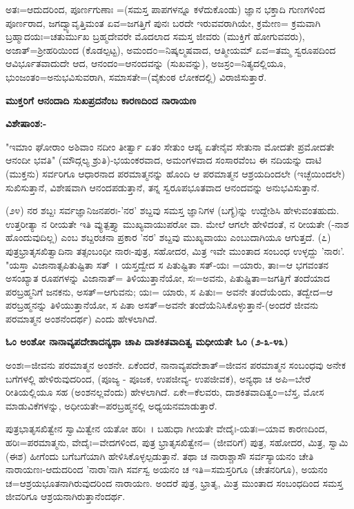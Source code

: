 ಅತಃ=ಆದುದರಿಂದ, ಪೂರ್ಣಗುಣಾಃ =(ಸಮಸ್ತ ಪಾಪಗಳನ್ನೂ ಕಳೆದುಕೊಂಡು) ಜ್ಞಾನ ಭಕ್ತಾದಿ ಗುಣಗಳಿಂದ ಪೂರ್ಣರಾದ, ಜಗದ್ವ್ಯಾವೃತ್ತಿಮಂತ ಏವ=ಜಗತ್ತಿಗೆ ಪುನಃ ಬರದೇ ಇರುವವರಾಗಿಯೇ, ಕ್ರಮೇಣ= ಕ್ರಮವಾಗಿ ಬ್ರಹ್ಮಾದಯಃ=ಚತುರ್ಮುಖ ಬ್ರಹ್ಮದೇವರೇ ಮೊದಲಾದ ಸಮಸ್ತ ಜೀವರು (ಮುಕ್ತಿಗೆ ಹೋಗುವವರು), ಅಜಾತ್=ಶ‍್ರೀಹರಿಯಿಂದ (ಕೊಡಲ್ಪಟ್ಟ), ಅಮಂದ೦=ನಿಷ್ಕಲ್ಮಷವಾದ, ಆತ್ಮೀಯಮ್ ಏವ=ತಮ್ಮ ಸ್ವರೂಪದಿಂದ ಆವಿರ್ಭೂತವಾದುದೇ ಆದ, ಆನಂದಂ=ಆನಂದವನ್ನು (ಸುಖವನ್ನು), ಅಜಸ್ರಂ=ನಿತ್ಯದಲ್ಲಿಯೂ, ಭುಂಜಂತಂ=ಅನುಭವಿಸುವರಾಗಿ, ಸಮಾಸತೇ=(ವೈಕುಂಠ ಲೋಕದಲ್ಲಿ) ವಿರಾಜಿಸುತ್ತಾರೆ.

\begin{center}
\textbf{ಮುಕ್ತರಿಗೆ ಆನಂದಾದಿ ಸುಖಪ್ರದನೆಂಬ ಕಾರಣದಿಂದ ನಾರಾಯಣ}
\end{center}

\noindent
\textbf{ವಿಶೇಷಾಂಶ:-}

"ಇಮಾಂ ಘೋರಾಂ ಅಶಿವಾಂ ನದೀಂ ತೀರ್ತ್ವಾ ಏತಂ ಸೇತುಂ ಆಪ್ಯ ಏತೇನೈವ ಸೇತುನಾ ಮೋದತೇ ಪ್ರಮೋದತೇ ಆನಂದೀ ಭವತಿ" (ಮೌದ್ಗಲ್ಯ ಶ್ರುತಿ)-ಭಯಂಕರವಾದ, ಅಮಂಗಳವಾದ ಸಂಸಾರವೆಂಬ ಈ ನದಿಯನ್ನು ದಾಟಿ (ಮುಕ್ತನು) ಸರ್ವರಿಗೂ ಆಧಾರನಾದ ಪರಮಾತ್ಮನನ್ನು ಹೊಂದಿ ಆ ಪರಮಾತ್ಮನ ಆಶ್ರಯದಿಂದಲೇ (ಇಚ್ಛೆಯಿಂದಲೇ) ಸುಖಿಸುತ್ತಾನೆ, ವಿಶೇಷವಾಗಿ ಆನಂದಪಡುತ್ತಾನೆ, ತನ್ನ ಸ್ವರೂಪಭೂತವಾದ ಆನಂದವನ್ನು ಅನುಭವಿಸುತ್ತಾನೆ.

(೨೪) ನರ ಶಬ್ದಃ ಸರ್ವಜ್ಞಾನಿಜನಪರಃ-'ನರ' ಶಬ್ದವು ಸಮಸ್ತ ಜ್ಞಾನಿಗಳ (ಬಗ್ಯೆ)ನ್ನು ಉದ್ದೇಶಿಸಿ ಹೇಳುವಂತಹುದು. ಉತ್ತರೀತ್ಯಾ ನ ರೀಯತೇ ಇತಿ ವ್ಯುತ್ಪತ್ತ್ಯಾ ಮುಖ್ಯವಾಯುಪರೋ ವಾ. ಮೇಲೆ ಆಗಲೇ ಹೇಳಿದಂತೆ, ನ ರೀಯತೇ (-ನಾಶ ಹೊಂದುವುದಿಲ್ಲ) ಎಂಬ ಶಬ್ದರಚನಾ ಪ್ರಕಾರ 'ನರ' ಶಬ್ದವು ಮುಖ್ಯವಾಯು ಎಂಬುದಾಗಿಯೂ ಆಗುತ್ತದೆ. (೭) ಪುತ್ರಭ್ರಾತೃಸಖಿತ್ವಾದಿನಾ ತತ್ಸಂಬಂಧೀ ನಾರಃ-ಪುತ್ರ, ಸಹೋದರ, ಮಿತ್ರ ಇವೇ ಮುಂತಾದ ಸಂಬಂಧ ಉಳ್ಳದ್ದು 'ನಾರಃ'. "ಯಸ್ತಾ ವಿಜಾನಾತ್ಸಪಿತುಷ್ಟಿತಾ ಸತ್~। ಯಸ್ತದ್ವೇದ ಸ ಪಿತುಷ್ಟಿತಾ ಸತ್-ಯಃ =ಯಾರು, ತಾಃ=ಆ ಭಗವಂತನ ಅಸಂಖ್ಯಾತ ರೂಪಗಳನ್ನು ವಿಜಾನಾತ್= ತಿಳಿಯುತ್ತಾನೆಯೋ, ಸಃ=ಅವನು, ಪಿತುಷ್ಟಿತಾ=ಜಗತ್ತಿಗೆ ತಂದೆಯಾದ ಪರಬ್ರಹ್ಮನಿಗೆ ಜನಕನು, ಅಸತ್=ಆಗುವನು; ಯಃ= ಯಾರು, ಸ ಪಿತುಃ= ಅವನೇ ತಂದೆಯೆಂದು, ತದ್ವೇದ=ಆ ಪರಬ್ರಹ್ಮನನ್ನು ತಿಳಿಯುತ್ತಾನೆಯೋ, ಸ ಪಿತಾ ಅಸತ್=ಅವನೇ ತಂದೆಯೆನಿಸಿಕೊಳ್ಳುತ್ತಾನೆ-(ಅಂದರೆ ಜೀವನು ಪರಮಾತ್ಮನ ಅಂಶನೆಂದರ್ಥ) ಎಂದು ಹೇಳಲಾಗಿದೆ.

\begin{center}
\textbf{ಓಂ ಅಂಶೋ ನಾನಾವ್ಯಪದೇಶಾದನ್ಯಥಾ ಚಾಪಿ ದಾಶಕಿತವಾದಿತ್ವ ಮಧೀಯತೇ ಓಂ (೨-೩-೪೩)}
\end{center}

ಅಂಶಃ=ಜೀವನು ಪರಮಾತ್ಮನ ಅಂಶನೇ. ಏಕೆಂದರೆ, ನಾನಾವ್ಯಪದೇಶಾತ್=ಜೀವನ ಪರಮಾತ್ಮನ ಸಂಬಂಧವು ಅನೇಕ ಬಗೆಗಳಲ್ಲಿ ಹೇಳಿರುವುದರಿಂದ, (ಪೂಜ್ಯ - ಪೂಜಕ, ಉಪಜೀವ್ಯ- ಉಪಜೀವಕ), ಅನ್ಯಥಾ ಚ ಅಪಿ=ಬೇರೆ ರೀತಿಯಲ್ಲಿಯೂ ಸಹ (ಅಂಶನಲ್ಲವೆಂದು) ಹೇಳಲಾಗಿದೆ. ಏಕೇ=ಕೆಲವರು, ದಾಶಕಿತವಾದಿತ್ವಂ=ಬೆಸ್ತ, ಮೋಸ ಮಾಡುವಿಕೆಗಳನ್ನು, ಅಧೀಯತೇ=ಪರಬ್ರಹ್ಮನಲ್ಲಿ ಅಧ್ಯಯನಮಾಡುತ್ತಾರೆ.

ಪುತ್ರಭಾತೃಸಖಿತ್ವೇನ ಸ್ವಾಮಿತ್ವೇನ ಯತೋ ಹರಿಃ~। ಬಹುಧಾ ಗೀಯತೇ ವೇದೈಃ-ಯತಃ=ಯಾವ ಕಾರಣದಿಂದ, ಹರಿಃ=ಪರಮಾತ್ಮನು, ವೇದೈಃ=ವೇದಗಳಿಂದ, ಪುತ್ರ ಭ್ರಾತೃಸಖಿತ್ವೇನ= (ಜೀವರಿಗೆ) ಪುತ್ರ, ಸಹೋದರ, ಮಿತ್ರ, ಸ್ವಾಮಿ (ಈಶ) ಹೀಗೆಂದು ಬಗೆಬಗೆಯಾಗಿ ಹೇಳಿಸಿಕೊಳ್ಳಲ್ಪಡುತ್ತಾನೆ. ತಥಾ ಚ ನಾರಾಶ್ಚಾಸೌ ಸರ್ವಸ್ಯಾಯನಂ ಚೇತಿ ನಾರಾಯಣಃ-ಆದುದರಿಂದ 'ನಾರಾ'ನಾಗಿ ಸರ್ವಸ್ವ ಅಯನಂ ಚ ಇತಿ=ಸಮಸ್ತರಿಗೂ (ಚೇತನರಿಗೂ), ಅಯನಂ ಚ=ಆಶ್ರಯಭೂತನಾಗಿರುವುದರಿಂದ ನಾರಾಯಣ. ಅಂದರೆ ಪುತ್ರ, ಭ್ರಾತೃ, ಮಿತ್ರ ಮುಂತಾದ ಸಂಬಂಧದಿಂದ ಸಮಸ್ತ ಜೀವರಿಗೂ ಆಶ್ರಯನಾಗಿರುತ್ತಾನೆಂದರ್ಥ.

